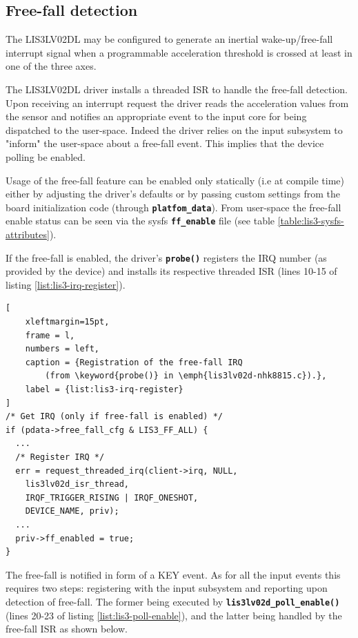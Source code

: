 \documentclass[a4paper,10pt]{article}
\newcommand{\keyword}[1]{\texttt{\textbf{#1}}}
\begin{document}
\begin{multicols}{2}
\subsection{Free-fall detection}
\label{sec:lis3_free-fall}
The LIS3LV02DL may be configured to generate an inertial wake-up/free-fall
interrupt signal when a programmable acceleration threshold is crossed at least
in one of the three axes.

The LIS3LV02DL driver installs a threaded ISR to handle the free-fall detection.
Upon receiving an interrupt request the driver reads the acceleration values
from the sensor and notifies an appropriate event to the input core for being
dispatched to the user-space.
Indeed the driver relies on the input subsystem to "inform" the user-space
about a free-fall event. This implies that the device polling be enabled.

Usage of the free-fall feature can be enabled only statically (i.e at compile
time) either by adjusting the driver's defaults or by passing custom settings
from the board initialization code (through \keyword{platfom\_data}).
From user-space the free-fall enable status can be seen via the sysfs
\keyword{ff\_enable} file (see table \ref{table:lis3-sysfs-attributes}).

If the free-fall is enabled, the driver's \keyword{probe()} registers the IRQ
number (as provided by the device) and installs its respective threaded ISR
(lines 10-15 of listing \ref{list:lis3-irq-register}).

\begin{lstlisting}[
	xleftmargin=15pt,
	frame = l,
	numbers = left,
	caption = {Registration of the free-fall IRQ
		(from \keyword{probe()} in \emph{lis3lv02d-nhk8815.c}).},
	label = {list:lis3-irq-register}
]
/* Get IRQ (only if free-fall is enabled) */
if (pdata->free_fall_cfg & LIS3_FF_ALL) {
  ...
  /* Register IRQ */
  err = request_threaded_irq(client->irq, NULL,
    lis3lv02d_isr_thread,
    IRQF_TRIGGER_RISING | IRQF_ONESHOT,
    DEVICE_NAME, priv);
  ...
  priv->ff_enabled = true;
}
\end{lstlisting}

The free-fall is notified in form of a KEY event. As for all the input
events this requires two steps: registering with the input subsystem
and reporting upon detection of free-fall.
The former being executed by \keyword{lis3lv02d\_poll\_enable()} (lines 20-23
of listing \ref{list:lis3-poll-enable}), and the latter being handled by the
free-fall ISR as shown below.


\end{multicols}
\end{document}
